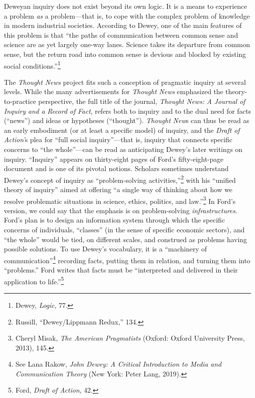 \documentclass[twoside,symmetric,nobib,justified]{tufte-book}
\begin{document}
Deweyan inquiry does not exist beyond its own logic. It is a means to
experience a problem \emph{as} a problem---that is, to cope with the
complex problem of knowledge in modern industrial societies. According
to Dewey, one of the main features of this problem is that ``the paths
of communication between common sense and science are as yet largely
one-way lanes. Science takes its departure from common sense, but the
return road into common sense is devious and blocked by existing social
conditions.''\footnote{Dewey, \emph{Logic}, 77.}

The \emph{Thought News} project fits such a conception of pragmatic
inquiry at several levels. While the many advertisements for
\emph{Thought News} emphasized the theory-to-practice perspective, the
full title of the journal, \emph{Thought News: A Journal of Inquiry and
a Record of Fact}, refers both to inquiry and to the dual need for facts
(``news'') and ideas or hypotheses (``thought''). \emph{Thought New}s
can thus be read as an early embodiment (or at least a specific model)
of inquiry, and the \emph{Draft of Action'}s plea for ``full social
inquiry''---that is, inquiry that connects specific concerns to ``the
whole''---can be read as anticipating Dewey's later writings on inquiry.
``Inquiry'' appears on thirty-eight pages of Ford's fifty-eight-page
document and is one of its pivotal notions. Scholars sometimes
understand Dewey's concept of inquiry as ``problem-solving
activities,''\footnote{Russill, ``Dewey/Lippmann Redux,'' 134.} with his
``unified theory of inquiry'' aimed at offering ``a single way of
thinking about how we resolve problematic situations in science, ethics,
politics, and law.''\footnote{Cheryl Misak, \emph{The American
  Pragmatists} (Oxford: Oxford University Press, 2013), 145.} In Ford's
version, we could say that the emphasis is on problem-solving
\emph{infrastructures}. Ford's plan is to design an information system
through which the specific concerns of individuals, ``classes'' (in the
sense of specific economic sectors), and ``the whole'' would be tied, on
different scales, and construed as problems having possible solutions.
To use Dewey's vocabulary, it is a ``machinery of
communication''\footnote{See Lana Rakow, \emph{John Dewey: A Critical
  Introduction to Media and Communication Theory} (New York: Peter Lang,
  2019).} recording facts, putting them in relation, and turning them
into ``problems.'' Ford writes that facts must be ``interpreted and
delivered in their application to life.''\footnote{Ford, \emph{Draft of
  Action,} 42.}
\end{document}
